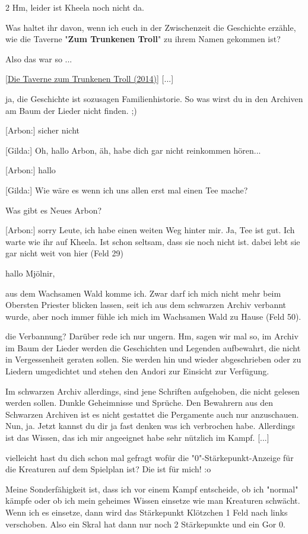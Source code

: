 \documentclass[10pt, a4paper, oneside]{book}
\begin{document}
\begin{multicols}{2}
Hm, leider ist Kheela noch nicht da.

Was haltet ihr davon, wenn ich euch in der Zwischenzeit die Geschichte erzähle, wie die Taverne "\textbf{Zum Trunkenen Troll}" zu ihrem Namen gekommen ist?

Also das war so ...

[\hyperref[storytext-2014-die-taverne-zum-trunkenen-troll]{Die Taverne zum Trunkenen Troll (2014)}] [...]

ja, die Geschichte ist sozusagen Familienhistorie. So was wirst du in den Archiven am Baum der Lieder nicht finden. ;)

[Arbon:] sicher nicht

[Gilda:] Oh, hallo Arbon, äh, habe dich gar nicht reinkommen hören...

[Arbon:] hallo

[Gilda:] Wie wäre es wenn ich uns allen erst mal einen Tee mache?

Was gibt es Neues Arbon?

[Arbon:] sorry Leute, ich habe einen weiten Weg hinter mir. Ja, Tee ist gut. Ich warte wie ihr auf Kheela. Ist schon seltsam, dass sie noch nicht ist. dabei lebt sie gar nicht weit von hier (Feld 29)

hallo Mjölnir,

aus dem Wachsamen Wald komme ich. Zwar darf ich mich nicht mehr beim Obersten Priester blicken lassen, seit ich aus dem schwarzen Archiv verbannt wurde, aber noch immer fühle ich mich im Wachsamen Wald zu Hause (Feld 50).

die Verbannung? Darüber rede ich nur ungern. Hm, sagen wir mal so, im Archiv im Baum der Lieder werden die Geschichten und Legenden aufbewahrt, die nicht in Vergessenheit geraten sollen. Sie werden hin und wieder abgeschrieben oder zu Liedern umgedichtet und stehen den Andori zur Einsicht zur Verfügung.

Im schwarzen Archiv allerdings, sind jene Schriften aufgehoben, die nicht gelesen werden sollen. Dunkle Geheimnisse und Sprüche. Den Bewahrern aus den Schwarzen Archiven ist es nicht gestattet die Pergamente auch nur anzuschauen. Nun, ja. Jetzt kannst du dir ja fast denken was ich verbrochen habe. Allerdings ist das Wissen, das ich mir angeeignet habe sehr nützlich im Kampf. [...]

vielleicht hast du dich schon mal gefragt wofür die "0"-Stärkepunkt-Anzeige für die Kreaturen auf dem Spielplan ist? Die ist für mich! :o

Meine Sonderfähigkeit ist, dass ich vor einem Kampf entscheide, ob ich "normal" kämpfe oder ob ich mein geheimes Wissen einsetze wie man Kreaturen schwächt. Wenn ich es einsetze, dann wird das Stärkepunkt Klötzchen 1 Feld nach links verschoben. Also ein Skral hat dann nur noch 2 Stärkepunkte und ein Gor 0.


\end{multicols}
\end{document}
